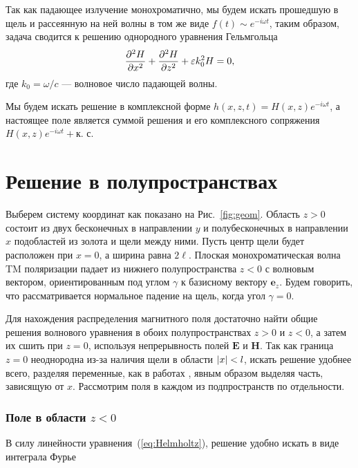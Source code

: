 Так как падающее излучение монохроматично, мы будем искать прошедшую в щель и рассеянную на ней волны в том же виде 
$f(t) \sim e^{-i \omega t}$, таким образом, задача сводится к решению однородного уравнения Гельмгольца
 \begin{equation}
   \label{eq:Helmholtz}
   \frac{\partial^2 H}{\partial x^2} +   \frac{\partial^2 H}{\partial z^2} + \varepsilon k_0^2 H = 0,
 \end{equation}
где $k_0 = \omega/c$ --- волновое число падающей волны. 

Мы будем искать решение в комплексной форме $h(x,z,t) = H(x,z)e^{-i \omega t}$, а настоящее поле является суммой решения и его комплексного сопряжения $H(x,z)e^{-i \omega t} + \text{к. с.}$

\section{Решение в полупространствах}
Выберем систему координат как показано на Рис.~\ref{fig:geom}. Область $z > 0$ состоит из двух бесконечных в направлении $y$ и полубесконечных в направлении $x$ подобластей из золота и щели между ними. Пусть центр щели будет расположен при $x = 0$, а ширина равна $2\ell$. Плоская монохроматическая волна TM поляризации падает из нижнего полупространства $z<0$ с волновым вектором, ориентированным под углом $\gamma$ к базисному вектору $\mathbf{e}_z$. Будем говорить, что рассматривается нормальное падение на щель, когда угол $\gamma = 0$.

 Для нахождения распределения магнитного поля достаточно найти общие решения волнового уравнения в обоих полупространствах $z>0$ и $z<0$, а затем их сшить при $z = 0$, используя непрерывность полей $\mathbf{E}$ и $\mathbf{H}$. Так как граница $z=0$ неоднородна из-за наличия щели в области
 $\lvert x\rvert < l$, искать решение удобнее всего, разделяя переменные, как в работах \cite{sturman2010transmission,gorkunov2011transmission}, 
 явным образом выделяя часть, 
 зависящую от $x$. Рассмотрим поля в каждом из подпространств по отдельности.

 \subsubsection{Поле в области $z < 0$}
 
В силу линейности уравнения~(\ref{eq:Helmholtz}), решение удобно искать в виде интеграла Фурье

